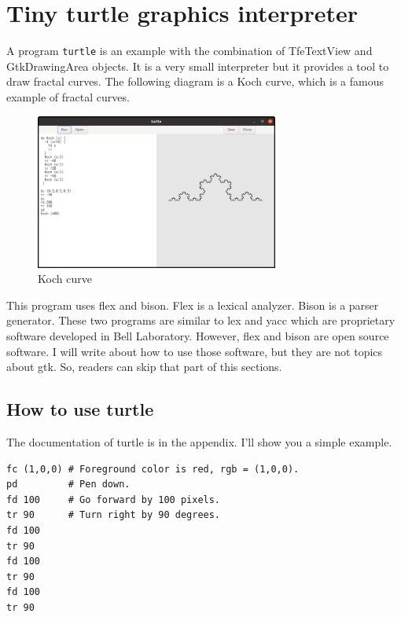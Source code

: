 \hypertarget{tiny-turtle-graphics-interpreter}{%
\section{Tiny turtle graphics
interpreter}\label{tiny-turtle-graphics-interpreter}}

A program \passthrough{\lstinline!turtle!} is an example with the
combination of TfeTextView and GtkDrawingArea objects. It is a very
small interpreter but it provides a tool to draw fractal curves. The
following diagram is a Koch curve, which is a famous example of fractal
curves.

\begin{figure}
\centering
\includegraphics[width=8cm,height=5.11cm]{../src/turtle/image/turtle_koch.png}
\caption{Koch curve}
\end{figure}

This program uses flex and bison. Flex is a lexical analyzer. Bison is a
parser generator. These two programs are similar to lex and yacc which
are proprietary software developed in Bell Laboratory. However, flex and
bison are open source software. I will write about how to use those
software, but they are not topics about gtk. So, readers can skip that
part of this sections.

\hypertarget{how-to-use-turtle}{%
\subsection{How to use turtle}\label{how-to-use-turtle}}

The documentation of turtle is in the appendix. I'll show you a simple
example.

\begin{lstlisting}
fc (1,0,0) # Foreground color is red, rgb = (1,0,0).
pd         # Pen down.
fd 100     # Go forward by 100 pixels.
tr 90      # Turn right by 90 degrees.
fd 100
tr 90
fd 100
tr 90
fd 100
tr 90
\end{lstlisting}

